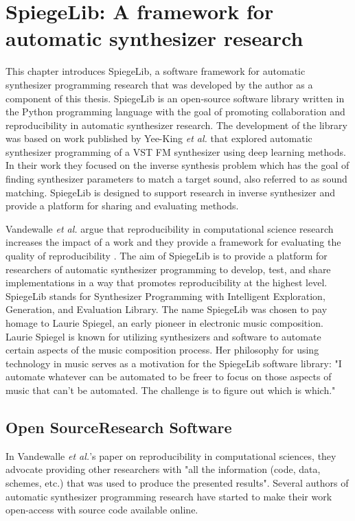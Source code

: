\graphicspath{{./}{./figures/}{./figures/spiegelib/}}

\chapter{SpiegeLib: A framework for automatic synthesizer research}
\label{chapter:spiegelib}

This chapter introduces SpiegeLib, a software framework for automatic synthesizer programming  research that was developed by the author as a component of this thesis. SpiegeLib is an open-source software library written in the Python programming language with the goal of promoting collaboration and reproducibility in automatic synthesizer research. The development of the library was based on work published by Yee-King \textit{et al.} \cite{yee2018automatic} that explored automatic synthesizer programming of a VST FM synthesizer using deep learning methods. In their work they focused on the inverse synthesis problem which has the goal of finding synthesizer parameters to match a target sound, also referred to as sound matching. SpiegeLib is designed to support research in inverse synthesizer and provide a platform for sharing and evaluating methods.

Vandewalle \textit{et al.} argue that reproducibility in computational science research increases the impact of a work and they provide a framework for evaluating the quality of reproducibility \cite{vandewalle2009reproducible}. The aim of SpiegeLib is to provide a platform for researchers of automatic synthesizer programming to develop, test, and share implementations in a way that promotes reproducibility at the highest level. SpiegeLib stands for Synthesizer Programming with Intelligent Exploration, Generation, and Evaluation Library. The name SpiegeLib was chosen to pay homage to Laurie Spiegel, an early pioneer in electronic music composition. Laurie Spiegel is known for utilizing synthesizers and software to automate certain aspects of the music composition process. Her philosophy for using technology in music serves as a motivation for the SpiegeLib software library: "I automate whatever can be automated to be freer to focus on those aspects of music that can't be automated. The challenge is to figure out which is which." \cite{hinkle2006women}

\section{Open SourceResearch Software}
 In Vandewalle \textit{et al.}'s paper on reproducibility in computational sciences, they advocate providing other researchers with "all the information (code, data, schemes, etc.) that was used to produce the presented results"\cite{vandewalle2009reproducible}. Several authors of automatic synthesizer programming research have started to make their work open-access with source code available online. 
 
